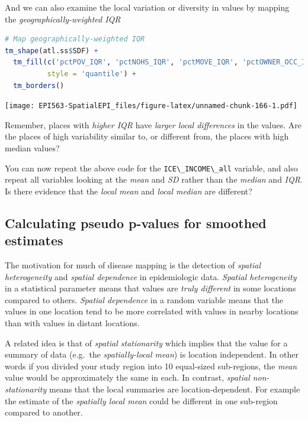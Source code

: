 \documentclass[
]{book}
\newcommand{\passthrough}[1]{#1}
\begin{document}
And we can also examine the local variation or diversity in values by mapping the \emph{geographically-weighted IQR}

\begin{lstlisting}[language=R]
# Map geographically-weighted IQR
tm_shape(atl.ss$SDF) + 
  tm_fill(c('pctPOV_IQR', 'pctNOHS_IQR', 'pctMOVE_IQR', 'pctOWNER_OCC_IQR'),
          style = 'quantile') +
  tm_borders()
\end{lstlisting}

\texttt{[image: EPI563-SpatialEPI\_files/figure-latex/unnamed-chunk-166-1.pdf]}

Remember, places with \emph{higher IQR} have \emph{larger local differences} in the values. Are the places of high variability similar to, or different from, the places with high median values?

You can now repeat the above code for the \passthrough{\lstinline!ICE\_INCOME\_all!} variable, and also repeat all variables looking at the \emph{mean} and \emph{SD} rather than the \emph{median} and \emph{IQR}. Is there evidence that the \emph{local mean} and \emph{local median} are different?

\hypertarget{calculating-pseudo-p-values-for-smoothed-estimates}{%
\subsection{Calculating pseudo p-values for smoothed estimates}\label{calculating-pseudo-p-values-for-smoothed-estimates}}

The motivation for much of disease mapping is the detection of \emph{spatial heterogeneity} and \emph{spatial dependence} in epidemiologic data. \emph{Spatial heterogeneity} in a statistical parameter means that values are \emph{truly different} in some locations compared to others. \emph{Spatial dependence} in a random variable means that the values in one location tend to be more correlated with values in nearby locations than with values in distant locations.

A related idea is that of \emph{spatial stationarity} which implies that the value for a summary of data (e.g.~the \emph{spatially-local mean}) is location independent. In other words if you divided your study region into 10 equal-sized sub-regions, the \emph{mean} value would be approximately the same in each. In contrast, \emph{spatial non-stationarity} means that the local summaries are location-dependent. For example the estimate of the \emph{spatially local mean} could be different in one sub-region compared to another.
\end{document}
